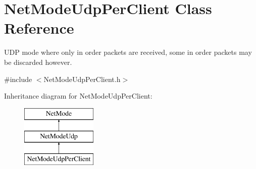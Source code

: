 \hypertarget{class_net_mode_udp_per_client}{
\section{NetModeUdpPerClient Class Reference}
\label{class_net_mode_udp_per_client}
}


UDP mode where only in order packets are received, some in order packets may be discarded however.  




{\ttfamily \#include $<$NetModeUdpPerClient.h$>$}

Inheritance diagram for NetModeUdpPerClient:\begin{figure}[H]
\begin{center}
\leavevmode
\includegraphics[height=3.000000cm]{class_net_mode_udp_per_client}
\end{center}
\end{figure}
